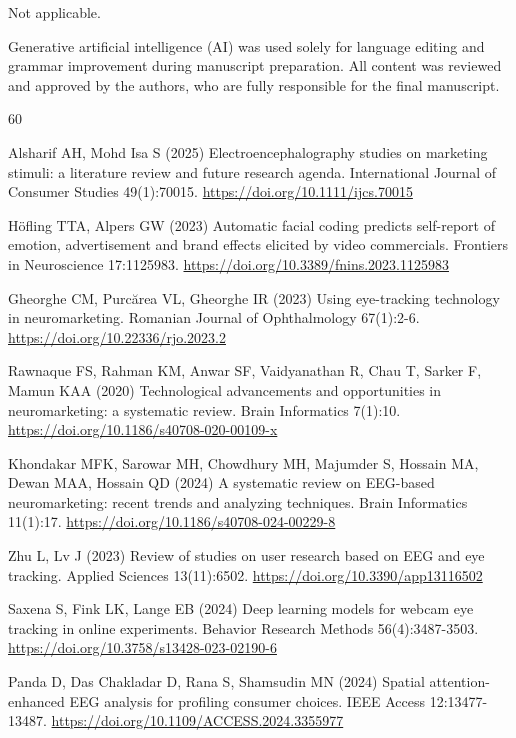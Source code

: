Not applicable.

Generative artificial intelligence (AI) was used solely for language editing and grammar improvement during manuscript preparation. All content was reviewed and approved by the authors, who are fully responsible for the final manuscript.

\begin{thebibliography}{60}
\small
\setlength{\itemsep}{-1.5pt}\setlength{\parsep}{0pt}

 Alsharif AH, Mohd Isa S (2025) Electroencephalography studies on marketing stimuli: a literature review and future research agenda. International Journal of Consumer Studies 49(1):70015. \url{https://doi.org/10.1111/ijcs.70015}

 H\"ofling TTA, Alpers GW (2023) Automatic facial coding predicts self-report of emotion, advertisement and brand effects elicited by video commercials. Frontiers in Neuroscience 17:1125983. \url{https://doi.org/10.3389/fnins.2023.1125983}

 Gheorghe CM, Purc\u{a}rea VL, Gheorghe IR (2023) Using eye-tracking technology in neuromarketing. Romanian Journal of Ophthalmology 67(1):2-6. \url{https://doi.org/10.22336/rjo.2023.2}

 Rawnaque FS, Rahman KM, Anwar SF, Vaidyanathan R, Chau T, Sarker F, Mamun KAA (2020) Technological advancements and opportunities in neuromarketing: a systematic review. Brain Informatics 7(1):10. \url{https://doi.org/10.1186/s40708-020-00109-x}

 Khondakar MFK, Sarowar MH, Chowdhury MH, Majumder S, Hossain MA, Dewan MAA, Hossain QD (2024) A systematic review on EEG-based neuromarketing: recent trends and analyzing techniques. Brain Informatics 11(1):17. \url{https://doi.org/10.1186/s40708-024-00229-8}

 Zhu L, Lv J (2023) Review of studies on user research based on EEG and eye tracking. Applied Sciences 13(11):6502. \url{https://doi.org/10.3390/app13116502}

 Saxena S, Fink LK, Lange EB (2024) Deep learning models for webcam eye tracking in online experiments. Behavior Research Methods 56(4):3487-3503. \url{https://doi.org/10.3758/s13428-023-02190-6}

 Panda D, Das Chakladar D, Rana S, Shamsudin MN (2024) Spatial attention-enhanced EEG analysis for profiling consumer choices. IEEE Access 12:13477-13487. \url{https://doi.org/10.1109/ACCESS.2024.3355977}


\end{thebibliography}
